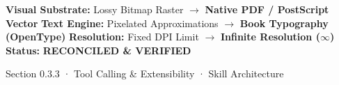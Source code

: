 \documentclass[10pt,a4paper,landscape]{article}
\begin{document}
\vspace*{0.05cm}
\noindent
\begin{tcolorbox}[
  colback=hhpaper,colframe=hhgray!35,arc=1.5pt,boxrule=0.4pt,
  top=1.5pt,bottom=1.5pt,left=6pt,right=6pt
]
  \pdgrotesk\scriptsize
  \noindent
  \textbf{Visual Substrate:} Lossy Bitmap Raster $\rightarrow$ \textbf{\color{pdcobalt}Native PDF / PostScript Vector}\hfill
  \textbf{Text Engine:} Pixelated Approximations $\rightarrow$ \textbf{\color{pdcobalt}Book Typography (OpenType)}\hfill
  \textbf{Resolution:} Fixed DPI Limit $\rightarrow$ \textbf{\color{pdcobalt}Infinite Resolution ($\infty$)}\hfill
  \textbf{Status:} \textbf{\color{pdteal}RECONCILED \& VERIFIED}
\end{tcolorbox}
\clearpage

\noindent
\begin{minipage}[t]{\linewidth}
  \hfill
  {\pdgrotesk\footnotesize\color{hhgray} Section 0.3.3 · Tool Calling \& Extensibility · Skill Architecture}\\
  \vspace*{0.03cm}
  \noindent{\color{hhgray!40}\rule{\linewidth}{0.5pt}}
\end{minipage}
\end{document}
